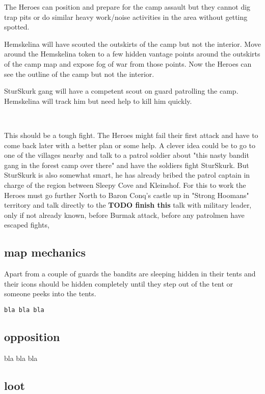 \noindent The Heroes can position and prepare for the camp assault but they cannot dig trap pits or do similar heavy work/noise activities in the area without getting spotted.

Hemskelina will have scouted the outskirts of the camp but not the interior. Move around the Hemskelina token to a few hidden vantage points around the outskirts of the camp map and expose fog of war from those points. Now the Heroes can see the outline of the camp but not the interior.

SturSkurk gang will have a competent scout on guard patrolling the camp. Hemskelina will track him but need help to kill him quickly.

\

This should be a tough fight. The Heroes might fail their first attack and have to come back later with a better plan or some help.
A clever idea could be to go to one of the villages nearby and talk to a patrol soldier about "this nasty bandit gang in the forest camp over there" and have the soldiers fight SturSkurk. But SturSkurk is also somewhat smart, he has already bribed the patrol captain in charge of the region between Sleepy Cove and Kleinshof. For this to work the Heroes must go further North to Baron Conq's castle up in "Strong Hoomans" territory and talk directly to the
\textbf{TODO finish this} talk with military leader, only if not already known, before Burmak attack, before any patrolmen have escaped fights,



\subsection*{map mechanics}

Apart from a couple of guards the bandits are sleeping hidden in their tents and their icons should be hidden completely until they step out of the tent or someone peeks into the tents.

\small \begin{verbatim}
bla bla bla
\end{verbatim} \normalsize


\subsection*{opposition}

bla bla bla


\subsection*{loot}

